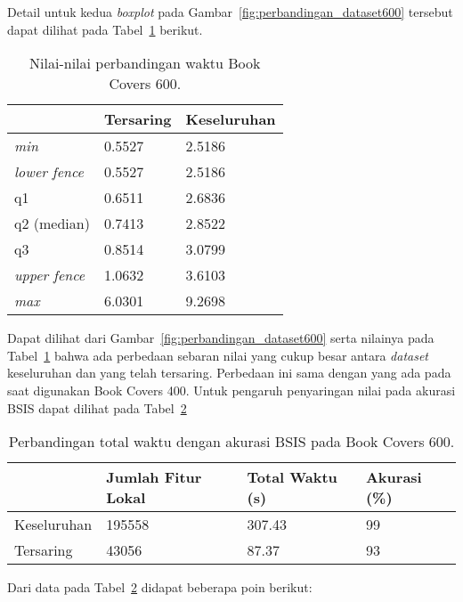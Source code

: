 Detail untuk kedua \textit{boxplot} pada Gambar~\ref{fig:perbandingan_dataset600} tersebut dapat dilihat pada Tabel~\ref{tab:perbandingan_dataset600} berikut.
\begin{table}[H]
	\centering
	\begin{tabular}{|l|l|l|}
		\hline
		& \textbf{Tersaring} & \textbf{Keseluruhan} \\ \hline
		\textit{min}         & 0.5527            & 2.5186              \\ \hline
		\textit{lower fence} & 0.5527            & 2.5186              \\ \hline
		q1                   & 0.6511            & 2.6836              \\ \hline
		q2 (median)          & 0.7413            & 2.8522              \\ \hline
		q3                   & 0.8514            & 3.0799              \\ \hline
		\textit{upper fence} & 1.0632            & 3.6103              \\ \hline
		\textit{max}         & 6.0301            & 9.2698              \\ \hline
	\end{tabular}
	\caption{Nilai-nilai perbandingan waktu Book Covers 600.}
	\label{tab:perbandingan_dataset600}
\end{table}
Dapat dilihat dari Gambar~\ref{fig:perbandingan_dataset600} serta nilainya pada Tabel~\ref{tab:perbandingan_dataset600} bahwa ada perbedaan sebaran nilai yang cukup besar antara \textit{dataset} keseluruhan dan yang telah tersaring. Perbedaan ini sama dengan yang ada pada saat digunakan Book Covers 400. Untuk pengaruh penyaringan nilai pada akurasi BSIS dapat dilihat pada Tabel~\ref{tab:waktu_akurasi_dataset600}
\begin{table}[H]
	\centering
	\begin{tabular}{|l|l|l|l|}
		\hline
		& \textbf{Jumlah Fitur Lokal} & \textbf{Total Waktu (s)} & \textbf{Akurasi (\%)} \\ \hline
		Keseluruhan & 195558 & 307.43                   & 99                    \\ \hline
		Tersaring   & 43056 & 87.37                    & 93                    \\ \hline
	\end{tabular}
	\caption{Perbandingan total waktu dengan akurasi BSIS pada Book Covers 600.}
	\label{tab:waktu_akurasi_dataset600}
\end{table}
Dari data pada Tabel~\ref{tab:waktu_akurasi_dataset600} didapat beberapa poin berikut:
